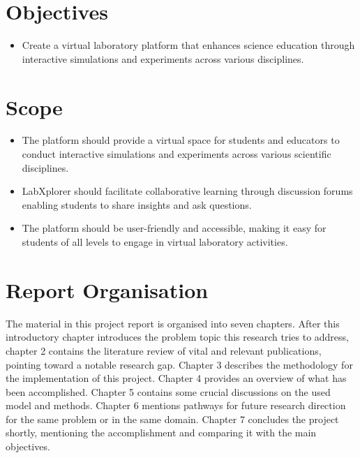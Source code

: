 \section{Objectives}
\begin{itemize}
    \item Create a virtual laboratory platform that enhances science education through interactive simulations and experiments across various disciplines.
\end{itemize}
\section{Scope}

\begin{itemize}
    \item The platform should provide a virtual space for students and educators to conduct interactive simulations and experiments across various scientific disciplines.
    \item LabXplorer should facilitate collaborative learning through discussion forums enabling students to share insights and ask questions.
    \item The platform should be user-friendly and accessible, making it easy for students of all levels to engage in virtual laboratory activities.
    
\end{itemize}
\section{Report Organisation}
The material in this project report is organised into seven chapters. After this introductory chapter introduces the problem topic this research tries to address, chapter 2 contains the literature review of vital and relevant publications, pointing toward a notable research gap. Chapter 3 describes the methodology for the implementation of this project. Chapter 4 provides an overview of what has been accomplished. Chapter 5 contains some crucial discussions on the used model and methods. Chapter 6 mentions pathways for future research direction for the same problem or in the same domain. Chapter 7 concludes the project shortly, mentioning the accomplishment and comparing it with the main objectives.